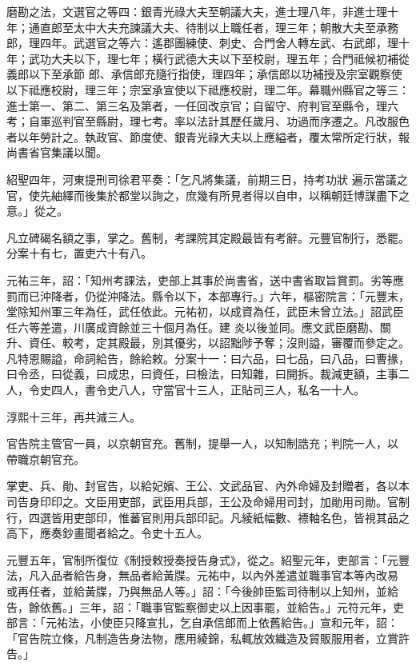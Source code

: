 \begin{pinyinscope}
 磨勘之法，文選官之等四：銀青光祿大夫至朝議大夫，進士理八年，非進士理十年；通直郎至太中大夫充諫議大夫、待制以上職任者，理三年；朝散大夫至承務郎，理四年。武選官之等六：遙郡團練使、刺史、合門舍人轉左武、右武郎，理十年；武功大夫以下，理七年；橫行武德大夫以下至校尉，理五年；合門祗候初補從義郎以下至承節
 郎、承信郎充隨行指使，理四年；承信郎以功補授及宗室觀察使以下祗應校尉，理三年；宗室承宣使以下祗應校尉，理二年。幕職州縣官之等三：進士第一、第二、第三名及第者，一任回改京官；自留守、府判官至縣令，理六考；自軍巡判官至縣尉，理七考。率以法計其歷任歲月、功過而序遷之。凡改服色者以年勞計之。執政官、節度使、銀青光祿大夫以上應縊者，覆太常所定行狀，報尚書省官集議以聞。



 紹聖四年，河東提刑司徐君平奏：「乞凡將集議，前期三日，持考功狀
 遍示當議之官，使先紬繹而後集於都堂以詢之，庶幾有所見者得以自申，以稱朝廷博謀盡下之意。」從之。



 凡立碑碣名額之事，掌之。舊制，考課院其定殿最皆有考辭。元豐官制行，悉罷。分案十有七，置吏六十有八。



 元祐三年，詔：「知州考課法，吏部上其事於尚書省，送中書省取旨賞罰。劣等應罰而已沖降者，仍從沖降法。縣令以下，本部專行。」六年，樞密院言：「元豐末，堂除知州軍三年為任，武任依此。元祐初，以成資為任，武臣未曾立法。」詔武臣任六等差遣，川廣成資餘並三十個月為任。建
 炎以後並同。應文武臣磨勘、關升、資任、較考，定其殿最，別其優劣，以詔黜陟予奪；沒則謚，審覆而參定之。凡特恩賜謚，命詞給告，餘給敕。分案十一：曰六品，曰七品，曰八品，曰曹掾，曰令丞，曰從義，曰成忠，曰資任，曰檢法，曰知雜，曰開拆。裁減吏額，主事二人，令史四人，書令史八人，守當官十三人，正貼司三人，私名一十人。



 淳熙十三年，再共減三人。



 官告院主管官一員，以京朝官充。舊制，提舉一人，以知制誥充；判院一人，以
 帶職京朝官充。



 掌吏、兵、勛、封官告，以給妃嬪、王公、文武品官、內外命婦及封贈者，各以本司告身印印之。文臣用吏部，武臣用兵部，王公及命婦用司封，加勛用司勛。官制行，四選皆用吏部印，惟蕃官則用兵部印記。凡綾紙幅數、褾軸名色，皆視其品之高下，應奏鈔畫聞者給之。令史十五人。



 元豐五年，官制所復位《制授敕授奏授告身式》，從之。紹聖元年，吏部言：「元豐法，凡入品者給告身，無品者給黃牒。元祐中，以內外差遣並職事官本等內改易
 或再任者，並給黃牒，乃與無品人等。」詔：「今後帥臣監司待制以上知州，並給告，餘依舊。」三年，詔：「職事官監察御史以上因事罷，並給告。」元符元年，吏部言：「元祐法，小使臣只降宣扎，乞自承信郎而上依舊給告。」宣和元年，詔：「官告院立條，凡制造告身法物，應用綾錦，私輒放效織造及貿販服用者，立賞許告。」




\end{pinyinscope}
